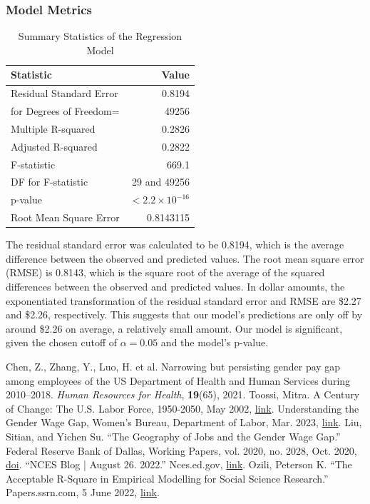 \documentclass{article}
\begin{document}
\subsubsection*{Model Metrics}
\begin{table}[h]
    \centering
    \begin{tabular}{lr}
    \toprule
    \textbf{Statistic} & \textbf{Value} \\
    \midrule
    Residual Standard Error & 0.8194 \\
    for Degrees of Freedom= & 49256 \\
    \midrule
    Multiple R-squared & 0.2826 \\
    Adjusted R-squared & 0.2822 \\
    F-statistic & 669.1 \\
    DF for F-statistic & 29 and 49256 \\
    p-value & $< 2.2 \times 10^{-16}$ \\
    Root Mean Square Error & 0.8143115 \\
    \bottomrule
    \end{tabular}
    \caption*{Summary Statistics of the Regression Model}
\end{table}

The residual standard error was calculated to be 0.8194, which is the average difference between the observed and predicted values.
The root mean square error (RMSE) is 0.8143, which is the square root of the average of the squared differences between the observed and predicted values. In dollar amounts, the exponentiated transformation
of the residual standard error and RMSE are \$2.27 and \$2.26, respectively. This suggests that our model's predictions are only off by around \$2.26 on average,
a relatively small amount. Our model is significant, given the chosen cutoff of $\alpha=0.05$ and the model's p-value.




\clearpage
\begin{thebibliography}{9}
    Chen, Z., Zhang, Y., Luo, H. et al. Narrowing but persisting gender pay gap among employees of the US Department of Health and Human Services during 2010–2018. \textit{Human Resources for Health}, \textbf{19}(65), 2021.
    Toossi, Mitra. A Century of Change: The U.S. Labor Force, 1950-2050, May 2002, \href{www.bls.gov/opub/mlr/2002/05/art2full.pdf}{link}.
    Understanding the Gender Wage Gap, Women’s Bureau, Department of Labor, Mar. 2023, \href{www.dol.gov/sites/dolgov/files/WB/equalpay/WB_issuebrief-undstg-wage-gap-v1.pdf}{link}. 
    Liu, Sitian, and Yichen Su. “The Geography of Jobs and the Gender Wage Gap.” Federal Reserve Bank of Dallas, Working Papers, vol. 2020, no. 2028, Oct. 2020, \href{https://doi.org/10.24149/wp2028}{doi}. 
    “NCES Blog | August 26. 2022.” Nces.ed.gov, \href{nces.ed.gov/blogs/nces/2022/08/26/default}{link}.
    Ozili, Peterson K. “The Acceptable R-Square in Empirical Modelling for Social Science Research.” Papers.ssrn.com, 5 June 2022, \href{papers.ssrn.com/sol3/papers.cfm?abstract_id=4128165}{link}.

    
\end{thebibliography}
\end{document}
